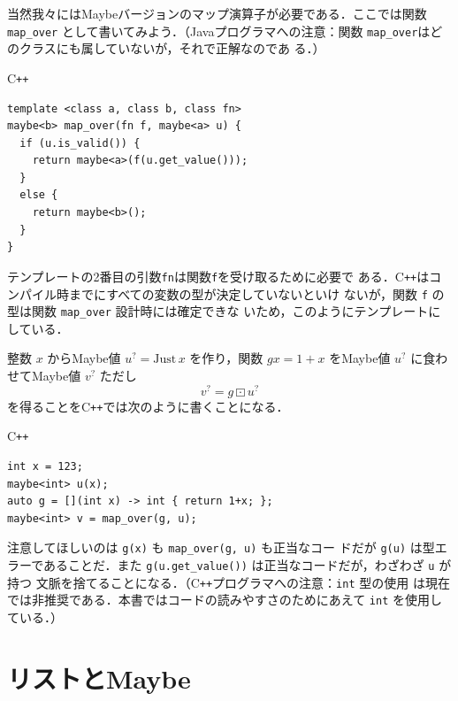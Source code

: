 \documentclass[a5paper,twoside,fleqn,draft]{jsbook}
\newcommand{\programminglanguage}[1]{\textsf{#1}}
\newcommand{\cxx}{\programminglanguage{C}\texttt{++}}
\newcommand{\cxxzerothree}{\cxx\programminglanguage{03}}
\newcommand{\java}{\programminglanguage{Java}}
\newcommand{\code}[1]{\texttt{#1}}
\newenvironment{cxxcode}{\begin{itembox}[r]{\cxx}}{\end{itembox}}
\DeclareMathOperator{\mMapMaybe}{\boxdot}
\newcommand{\mValueConstructor}[1]{\mathrm{#1}}
\newcommand{\mValueWith}[2]{\mValueConstructor{#1}\,#2}
\newcommand{\mJustWith}[1]{\mValueWith{Just}{#1}}
\newcommand{\mMaybe}[1]{{#1}^?}
\begin{document}
当然我々にはMaybeバージョンのマップ演算子が必要である．ここでは関数
\code{map\_over} として書いてみよう．（\java プログラマへの注意：関数
  \code{map\_over}はどのクラスにも属していないが，それで正解なのであ
  る．）
\begin{cxxcode}
\begin{verbatim}
template <class a, class b, class fn>
maybe<b> map_over(fn f, maybe<a> u) {
  if (u.is_valid()) {
    return maybe<a>(f(u.get_value()));
  }
  else {
    return maybe<b>();
  }
}
\end{verbatim}
\end{cxxcode}
テンプレートの2番目の引数\code{fn}は関数\code{f}を受け取るために必要で
ある．\cxx はコンパイル時までにすべての変数の型が決定していないといけ
ないが，関数 \code{f} の型は関数 \code{map\_over} 設計時には確定できな
いため，このようにテンプレートにしている．

整数 $x$ からMaybe値 $\mMaybe{u}=\mJustWith{x}$ を作り，関数 $gx=1+x$
をMaybe値 $\mMaybe{u}$ に食わせてMaybe値 $\mMaybe{v}$ ただし
\begin{equation}
  \mMaybe{v}
  =g\mMapMaybe\mMaybe{u}
\end{equation}
を得ることを\cxx では次のように書くことになる．
\begin{cxxcode}
\begin{verbatim}
int x = 123;
maybe<int> u(x);
auto g = [](int x) -> int { return 1+x; };
maybe<int> v = map_over(g, u);
\end{verbatim}
\end{cxxcode}
注意してほしいのは \code{g(x)} も \code{map\_over(g, u)} も正当なコー
ドだが \code{g(u)} は型エラーであることだ．また
\code{g(u.get\_value())} は正当なコードだが，わざわざ \code{u} が持つ
文脈を捨てることになる．（\cxx プログラマへの注意：\code{int} 型の使用
は現在では非推奨である．本書ではコードの読みやすさのためにあえて
\code{int} を使用している．）


\section{リストとMaybe}
\end{document}
